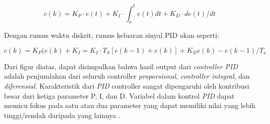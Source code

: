 \begin{equation}
	c(k)=K_{P}\cdot e(t)+K_{I}\cdot \int_{o}^{t}e(t)dt+K_{D}\cdot de(t)/dt
\end{equation}

Dengan rumus waktu diskrit, rumus keluaran sinyal PID akan seperti:

\begin{equation}
	c(k)=K_{P}(e(k)+K_{I}=K_{I}\cdot T_{S}[e(k-1)+e(k)]+K_{D}e(k)-e(k-1)/T_{s}
\end{equation}


Dari figur diatas, dapat disimpulkan bahwa hasil output dari \textit{controller PID} adalah penjumlahan dari seluruh controller \textit{proporsional}, \textit{controller} \textit{integral}, dan \textit{diferensial}. Karakteristik dari \textit{PID} controller sangat dipengaruhi oleh kontribusi besar dari ketiga parameter P, I, dan D. Variabel dalam kontrol \textit{PID} dapat memicu fokus pada satu atau dua parameter yang dapat memiliki nilai yang lebih tinggi/rendah daripada yang lainnya \citep{arizona2018miniatur}.
